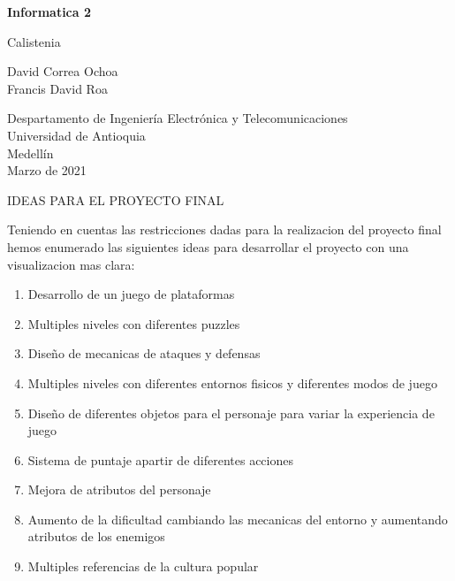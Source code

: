 \documentclass{article}
\begin{document}
\begin{titlepage}
    \begin{center}
        \vspace*{1cm}
            
        \huge
        \textbf{Informatica 2 }
            
        \vspace{0.5cm}
        \LARGE
        Calistenia
            
        \vspace{1.5cm}
            
        David Correa Ochoa\\
        Francis David Roa    
            
            
        \vfill
            
        \vspace{0.8cm}
            
        \Large
        Despartamento de Ingeniería Electrónica y Telecomunicaciones\\
        Universidad de Antioquia\\
        Medellín\\
        Marzo de 2021
            
    \end{center}
\end{titlepage}

\begin{center}
    \huge
    IDEAS PARA EL PROYECTO FINAL
\end{center}

Teniendo en cuentas las restricciones dadas para la realizacion del proyecto final hemos enumerado las siguientes ideas para desarrollar el proyecto con una visualizacion mas clara:

\begin{enumerate}
    \vspace{0.8cm}
    \item Desarrollo de un juego de plataformas
    \item Multiples niveles con diferentes puzzles 
    \item Diseño de mecanicas de ataques y defensas
    \item Multiples niveles con diferentes entornos fisicos y diferentes modos de juego
    \item Diseño de diferentes objetos para el personaje para variar la experiencia de juego
    \item Sistema de puntaje apartir de diferentes acciones
    \item Mejora de atributos del personaje
    \item Aumento de la dificultad cambiando las mecanicas del entorno y aumentando atributos de los enemigos
    \item Multiples referencias de la cultura popular
    
    
    
    
\end{enumerate}
\end{document}
